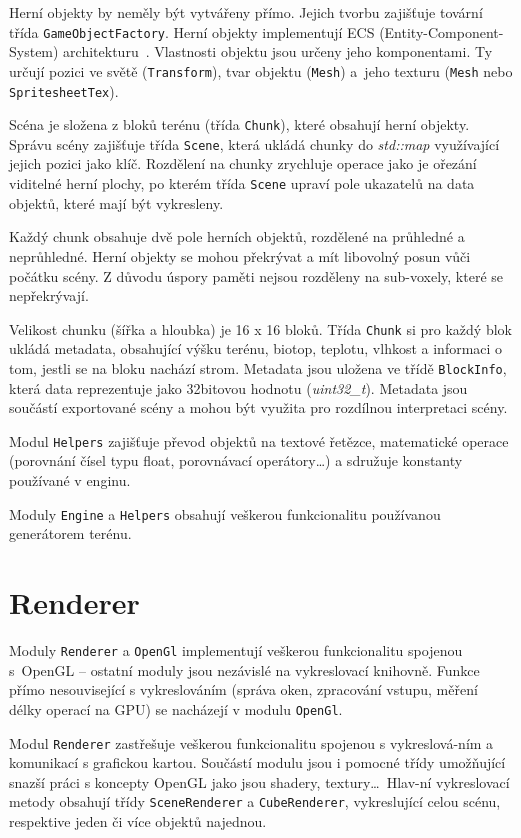 \documentclass[thesis=M,czech]{FITthesis}[2019/12/23]
\begin{document}
Herní objekty by neměly být vytvářeny přímo. Jejich tvorbu zajišťuje tovární třída \texttt{GameObjectFactory}. Herní objekty implementují ECS (Entity-Component-System) architekturu~\cite{ecs}. Vlastnosti objektu jsou určeny jeho komponentami. Ty určují pozici ve světě (\texttt{Transform}), tvar objektu (\texttt{Mesh}) a~jeho texturu (\texttt{Mesh} nebo \texttt{SpritesheetTex}).

Scéna je složena z bloků terénu (třída \texttt{Chunk}), které obsahují herní objekty. Správu scény zajišťuje třída \texttt{Scene}, která ukládá chunky do \textit{std::map} využívající jejich pozici jako klíč. Rozdělení na chunky zrychluje operace jako je ořezání viditelné herní plochy, po kterém třída \texttt{Scene} upraví pole ukazatelů na data objektů, které mají být vykresleny.

Každý chunk obsahuje dvě pole herních objektů, rozdělené na průhledné a neprůhledné. Herní objekty se mohou překrývat a mít libovolný posun vůči počátku scény. Z důvodu úspory paměti nejsou rozděleny na sub-voxely, které se nepřekrývají.

Velikost chunku (šířka a hloubka) je 16 x 16 bloků. Třída \texttt{Chunk} si pro každý blok ukládá metadata, obsahující výšku terénu, biotop, teplotu, vlhkost a informaci o tom, jestli se na bloku nachází strom. Metadata jsou uložena ve třídě \texttt{BlockInfo}, která data reprezentuje jako 32bitovou hodnotu (\textit{uint32\_t}). Metadata jsou součástí exportované scény a mohou být využita pro rozdílnou interpretaci scény.

Modul \texttt{Helpers} zajišťuje převod objektů na textové řetězce, matematické operace (porovnání čísel typu float, porovnávací operátory\dots) a sdružuje konstanty používané v enginu.

Moduly \texttt{Engine} a \texttt{Helpers} obsahují veškerou funkcionalitu používanou generátorem terénu. 

\section{Renderer}

Moduly \texttt{Renderer} a \texttt{OpenGl} implementují veškerou funkcionalitu spojenou s~OpenGL -- ostatní moduly jsou nezávislé na vykreslovací knihovně. Funkce přímo nesouvisející s vykreslováním (správa oken, zpracování vstupu, měření délky operací na GPU) se nacházejí v modulu \texttt{OpenGl}.

Modul \texttt{Renderer} zastřešuje veškerou funkcionalitu spojenou s vykreslová-ním a komunikací s grafickou kartou. Součástí modulu jsou i pomocné třídy umožňující snazší práci s koncepty OpenGL jako jsou shadery, textury\dots ~Hlav-ní vykreslovací metody obsahují třídy \texttt{SceneRenderer} a \texttt{CubeRenderer}, vykreslující celou scénu, respektive jeden či více objektů najednou.
\end{document}

